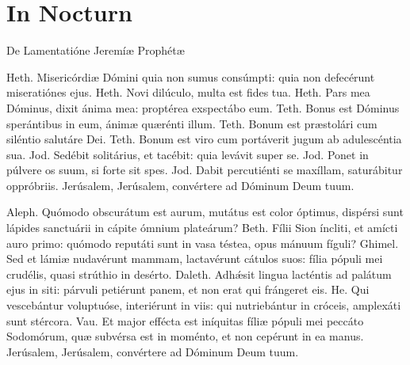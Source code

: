 \section*{In  Nocturn}









    \lesson

De Lamentatióne Jeremíæ Prophétæ


Heth. Misericórdiæ Dómini quia non sumus consúmpti: quia non defecérunt
miseratiónes ejus. Heth. Novi dilúculo, multa est fides tua. Heth. Pars mea
Dóminus, dixit ánima mea: proptérea exspectábo eum. Teth. Bonus est Dóminus
sperántibus in eum, ánimæ quærénti illum. Teth. Bonum est præstolári cum
siléntio salutáre Dei. Teth. Bonum est viro cum portáverit jugum ab
adulescéntia sua. Jod. Sedébit solitárius, et tacébit: quia levávit super se.
Jod. Ponet in púlvere os suum, si forte sit spes. Jod. Dabit percutiénti se
maxíllam, saturábitur oppróbriis. Jerúsalem, Jerúsalem, convértere ad Dóminum
Deum tuum.


 \lesson


Aleph. Quómodo obscurátum est aurum, mutátus est color óptimus, dispérsi sunt
lápides sanctuárii in cápite ómnium plateárum? Beth. Fílii Sion íncliti, et
amícti auro primo: quómodo reputáti sunt in vasa téstea, opus mánuum fíguli?
Ghimel. Sed et lámiæ nudavérunt mammam, lactavérunt cátulos suos: fília pópuli
mei crudélis, quasi strúthio in desérto. Daleth. Adhǽsit lingua lacténtis ad
palátum ejus in siti: párvuli petiérunt panem, et non erat qui frángeret eis.
He. Qui vescebántur voluptuóse, interiérunt in viis: qui nutriebántur in
cróceis, amplexáti sunt stércora. Vau. Et major effécta est iníquitas fíliæ
pópuli mei peccáto Sodomórum, quæ subvérsa est in moménto, et non cepérunt in
ea manus. Jerúsalem, Jerúsalem, convértere ad Dóminum Deum tuum.

